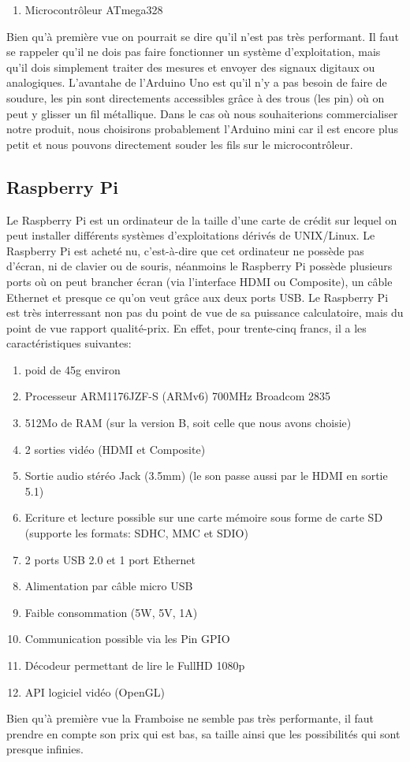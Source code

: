 \documentclass[a4paper,12pt]{article}
\begin{document}
{\begin{enumerate}
\item Microcontrôleur ATmega328
\end{enumerate}
Bien qu'à première vue on pourrait se dire qu'il n'est pas très performant. Il faut se rappeler qu'il ne dois pas faire fonctionner un système d'exploitation, mais qu'il dois simplement traiter des mesures et envoyer des signaux digitaux ou analogiques. L'avantahe de l'Arduino Uno est qu'il n'y a pas besoin de faire de soudure, les pin sont directements accessibles grâce à des trous (les pin) où on peut y glisser un fil métallique. Dans le cas où nous souhaiterions commercialiser notre produit, nous choisirons probablement l'Arduino mini car il est encore plus petit et nous pouvons directement souder les fils sur le microcontrôleur.

\subsection{Raspberry Pi}
Le Raspberry Pi\cite{RaspberryPiCaracteristiques} est un ordinateur de la taille d'une carte de crédit sur lequel on peut installer différents systèmes d'exploitations dérivés de UNIX/Linux. Le Raspberry Pi est acheté nu, c'est-à-dire que cet ordinateur ne possède pas d'écran, ni de clavier ou de souris, néanmoins le Raspberry Pi possède plusieurs ports où on peut brancher écran (via l'interface HDMI ou Composite), un câble Ethernet et presque ce qu'on veut grâce aux deux ports USB. Le Raspberry Pi est très interressant non pas du point de vue de sa puissance calculatoire, mais du point de vue rapport qualité-prix. En effet, pour trente-cinq francs, il a les caractéristiques suivantes: 
\begin{enumerate}
\item poid de 45g environ
\item Processeur ARM1176JZF-S (ARMv6) 700MHz Broadcom 2835
\item 512Mo de RAM (sur la version B, soit celle que nous avons choisie)
\item 2 sorties vidéo (HDMI et Composite) 
\item Sortie audio stéréo Jack (3.5mm) (le son passe aussi par le HDMI en sortie 5.1)
\item Ecriture et lecture possible sur une carte mémoire sous forme de carte SD (supporte les formats: SDHC, MMC et SDIO)
\item 2 ports USB 2.0 et 1 port Ethernet
\item Alimentation par câble micro USB
\item Faible consommation (5W, 5V, 1A)
\item Communication possible via les Pin GPIO
\item Décodeur permettant de lire le FullHD  1080p
\item API logiciel vidéo (OpenGL)
\end{enumerate}
Bien qu'à première vue la Framboise ne semble pas très performante, il faut prendre en compte son prix qui est bas, sa taille ainsi que les possibilités qui sont presque infinies.

}
\end{document}
